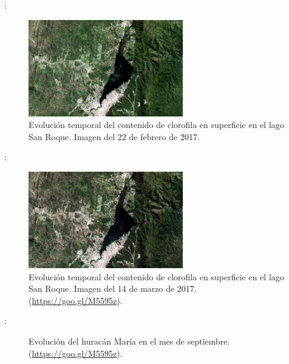\documentclass[handout,aspectratio=169]{beamer}
\begin{document}
\begin{frame}{\secname : \subsecname}
    \begin{figure}[h!]
        \centering
        \includegraphics[width=0.6\textwidth]{fig:lake-end.jpeg}
        \caption{Evolución temporal del contenido de clorofila en superficie en el lago San Roque. Imagen del 22 de febrero de 2017.}
        \label{fig:lake-end}
    \end{figure}
\end{frame}

\begin{frame}{\secname : \subsecname}
    \begin{figure}[h!]
        \centering
        \includegraphics[width=0.6\textwidth]{fig:lake-aft.jpeg}
        \caption{Evolución temporal del contenido de clorofila en superficie en el lago San Roque. Imagen del 14 de marzo de 2017. (\href{https://goo.gl/M5595z}{https://goo.gl/M5595z}).}
        \label{fig:lake-aft}
    \end{figure}
\end{frame}

\begin{frame}{\secname : \subsecname}
    \begin{figure}[h!]
    \centering
    \caption{Evolución del huracán María en el mes de septiembre. (\href{https://goo.gl/M5595z}{https://goo.gl/M5595z}).}
    \end{figure}
\end{frame}
\end{document}
